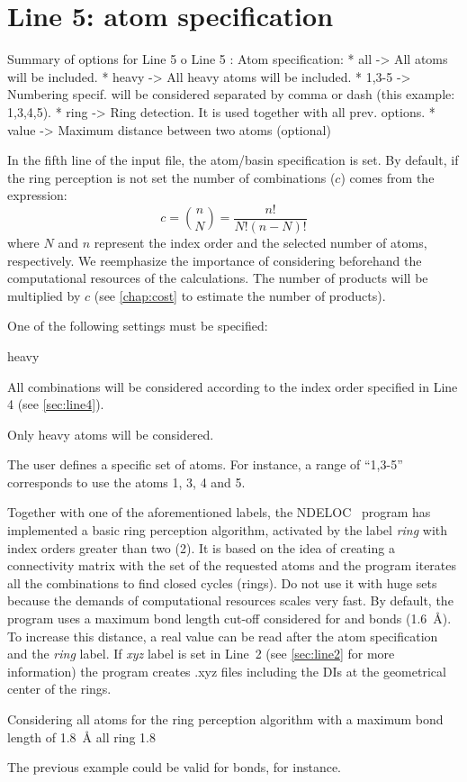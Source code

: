 \documentclass[a4paper,11pt,openany]{memoir}
\newcommand\programa{\textsc{NDELOC}}
\begin{document}
\section{Line 5: atom specification}\label{sec:line5}
\begin{recuadro}{Summary of options for Line 5}
o Line 5 :  Atom specification:
 *  all    -> All atoms will be included.
 *  heavy  -> All heavy atoms will be included.
 *  1,3-5  -> Numbering specif. will be considered separated by comma or
              dash (this example: 1,3,4,5).
 *  ring   -> Ring detection. It is used together with all prev. options.
 *  value  -> Maximum distance between two atoms (optional)
\end{recuadro}
In the fifth line of the input file, the atom/basin specification is set. By default, if the ring perception is not set the number of combinations ($c$) comes from the expression:
\begin{equation}
	c = \binom{n}{N} = \frac{n!}{N!(n-N)!}
\end{equation}
where $N$ and $n$ represent the index order and the selected number of atoms, respectively. We reemphasize the importance of considering beforehand the computational resources of the calculations. The number of products will be multiplied by $c$ (see \autoref{chap:cost} to estimate the number of products).

One of the following settings must be specified:
\begin{labeling}{heavy}
	\item[all] All combinations will be considered according to the index order specified in Line 4 (see \autoref{sec:line4}).
	\item[heavy] Only heavy atoms will be considered.
	\item[\emph{range}] The user defines a specific set of atoms. For instance, a range of ``1,3-5'' corresponds to use the atoms 1, 3, 4 and 5.
\end{labeling}
Together with one of the aforementioned labels, the \programa~ program has implemented a basic ring perception algorithm, activated by the label \emph{ring} with index orders greater than two (2). It is based on the idea of creating a connectivity matrix with the set of the requested atoms and the program iterates all the combinations to find closed cycles (rings). Do not use it with huge sets because the demands of computational resources scales very fast. By default, the program uses a maximum bond length cut-off considered for  and  bonds (\SI{1.6}{\angstrom}). To increase this distance, a real value can be read after the atom specification and the \emph{ring} label. If \emph{xyz} label is set in Line~2 (see \autoref{sec:line2} for more information) the program creates .xyz files including the \acp{DI} at the geometrical center of the rings.
\begin{myexample}{Considering all atoms for the ring perception algorithm with a maximum bond length of \SI{1.8}{\angstrom}}
all ring 1.8
\end{myexample}
The previous example could be valid for  bonds, for instance.
\end{document}
